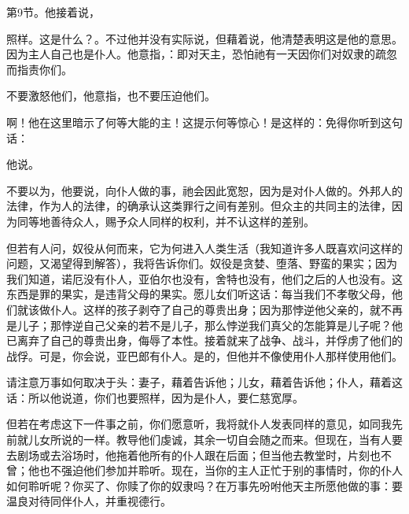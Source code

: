 第9节。他接着说，\par

照样。这是什么？。不过他并没有实际说，但藉着说，他清楚表明这是他的意思。因为主人自己也是仆人。他意指，：即对天主，恐怕祂有一天因你们对奴隶的疏忽而指责你们。\par

不要激怒他们，他意指，也不要压迫他们。\par

\par

啊！他在这里暗示了何等大能的主！这提示何等惊心！是这样的：免得你听到这句话：\par

他说。\par

不要以为，他要说，向仆人做的事，祂会因此宽恕，因为是对仆人做的。外邦人的法律，作为人的法律，的确承认这类罪行之间有差别。但众主的共同主的法律，因为同等地善待众人，赐予众人同样的权利，并不认这样的差别。\par

但若有人问，奴役从何而来，它为何进入人类生活（我知道许多人既喜欢问这样的问题，又渴望得到解答），我将告诉你们。奴役是贪婪、堕落、野蛮的果实；因为我们知道，诺厄没有仆人，亚伯尔也没有，舍特也没有，他们之后的人也没有。这东西是罪的果实，是违背父母的果实。愿儿女们听这话：每当我们不孝敬父母，他们就该做仆人。这样的孩子剥夺了自己的尊贵出身；因为那悖逆他父亲的，就不再是儿子；那悖逆自己父亲的若不是儿子，那么悖逆我们真父的怎能算是儿子呢？他已离弃了自己的尊贵出身，侮辱了本性。接着就来了战争、战斗，并俘虏了他们的战俘。可是，你会说，亚巴郎有仆人。是的，但他并不像使用仆人那样使用他们。\par

请注意万事如何取决于头：妻子，藉着告诉他；儿女，藉着告诉他；仆人，藉着这话：所以他说道，你们也要照样，因为是仆人，要仁慈宽厚。\par

但若在考虑这下一件事之前，你们愿意听，我将就仆人发表同样的意见，如同我先前就儿女所说的一样。教导他们虔诚，其余一切自会随之而来。但现在，当有人要去剧场或去浴场时，他拖着他所有的仆人跟在后面；但当他去教堂时，片刻也不曾；他也不强迫他们参加并聆听。现在，当你的主人正忙于别的事情时，你的仆人如何聆听呢？你买了、你赎了你的奴隶吗？在万事先吩咐他天主所愿他做的事：要温良对待同伴仆人，并重视德行。\par


